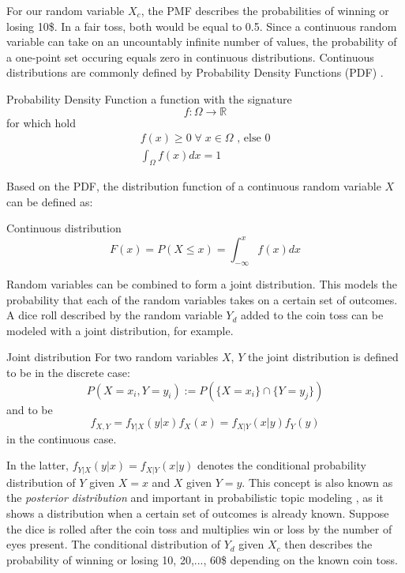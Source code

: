 For our random variable $X_c$, the PMF describes the probabilities of winning or losing 10\$. In a fair toss, both would be equal to 0.5.
Since a continuous random variable can take on an uncountably infinite number of values, the probability of a one-point set occuring equals zero in continuous distributions. Continuous distributions are commonly defined by Probability Density Functions (PDF) \cite{DBLP:phd/dnb/Kling16}.
\begin{definition}{Probability Density Function} a function with the signature
\begin{equation}
f : \Omega \rightarrow \mathbb{R}
\end{equation}
for which hold
\begin{gather}
f(x) \geq 0 \; \forall \; x \in \Omega \text{ , else } 0 \\
\int_{\Omega} f(x)dx = 1
\end{gather}
\end{definition}
Based on the PDF, the distribution function of a continuous random variable $X$ can be defined as:
\begin{definition}{Continuous distribution}
\begin{equation}
F(x) = P(X \leq x) = \int_{-\infty}^{x} f(x)dx
\end{equation}
\end{definition}
Random variables can be combined to form a joint distribution. This models the probability that each of the random variables takes on a certain set of outcomes. A dice roll described by the random variable $Y_d$ added to the coin toss can be modeled with a joint distribution, for example.
\begin{definition}{Joint distribution} For two random variables $X$, $Y$ the joint distribution is defined to be in the discrete case:
\begin{equation}
P(X=x_i, Y=y_i) := P(\{X=x_i\}\cap\{Y=y_j\})
\end{equation}
and to be
\begin{equation}
f_{X,Y} = f_{Y|X}(y|x)f_X(x) = f_{X|Y}(x|y)f_Y(y)
\end{equation}
in the continuous case.
\end{definition}
In the latter, $f_{Y|X}(y|x) = f_{X|Y}(x|y)$ denotes the conditional probability distribution of $Y$ given $X=x$ and $X$ given $Y=y$. This concept is also known as the \textit{posterior distribution} and important in probabilistic topic modeling \cite{Blei:2012:PTM:2133806.2133826}, as it shows a distribution when a certain set of outcomes is already known. Suppose the dice is rolled after the coin toss and multiplies win or loss by the number of eyes present. The conditional distribution of $Y_d$ given $X_c$ then describes the probability of winning or losing 10, 20,..., 60\$ depending on the known coin toss.
